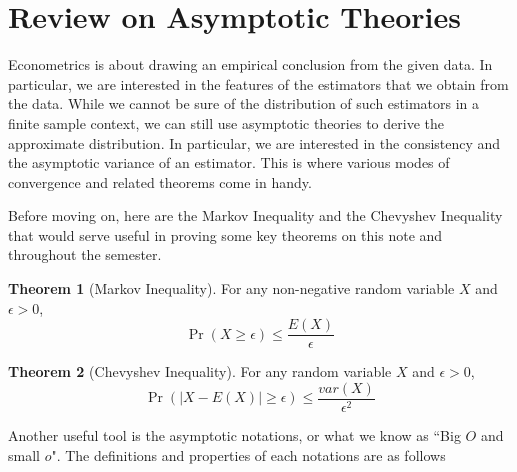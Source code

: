 \documentclass[12pt]{article}
\theoremstyle{definition}
\theoremstyle{property}
\theoremstyle{example}
\newtheorem{theorem}{Theorem}[section]
\begin{document}
\section{Review on Asymptotic Theories}
Econometrics is about drawing an empirical conclusion from the given data. In particular, we are interested in the features of the estimators that we obtain from the data. While we cannot be sure of the distribution of such estimators in a finite sample context, we can still use asymptotic theories to derive the approximate distribution. In particular, we are interested in the consistency and the asymptotic variance of an estimator. This is where various modes of convergence and related theorems come in handy. \par
Before moving on, here are the Markov Inequality and the Chevyshev Inequality that would serve useful in proving some key theorems on this note and throughout the semester. 
\begin{mdframed}[backgroundcolor=green!5] 
\begin{theorem}[Markov Inequality]
For any non-negative random variable $X$ and $\epsilon>0$,
\small{\[
\Pr(X\geq\epsilon)\leq\frac{E(X)}{\epsilon}
\] }\normalsize
\end{theorem}
\begin{theorem}[Chevyshev Inequality]
For any random variable $X$ and $\epsilon>0$, 
\small{\[
\Pr(|X-E(X)|\geq\epsilon)\leq\frac{var(X)}{\epsilon^2}
\] }\normalsize
\end{theorem}
\end{mdframed}\par
Another useful tool is the asymptotic notations, or what we know as ``Big $O$ and small $o$". The definitions and properties of each notations are as follows%
\end{document}
